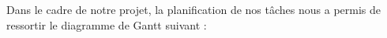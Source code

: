 
%
Dans le cadre de notre projet, la planification de nos tâches nous a permis de ressortir le diagramme de Gantt suivant : 

